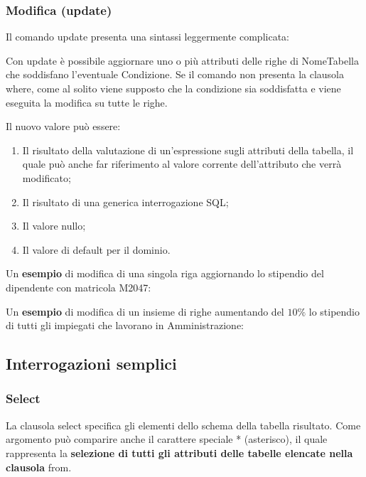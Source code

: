 \documentclass[a4paper]{article}
\begin{document}
	\subsubsection{Modifica (\textsf{update})}
	
	Il comando \textsf{update} presenta una sintassi leggermente complicata:
	
	Con \textsf{update} è possibile aggiornare uno o più attributi delle righe di \textsf{NomeTabella} che soddisfano l'eventuale \textsf{Condizione}. Se il comando non presenta la clausola \textsf{where}, come al solito viene supposto che la condizione sia soddisfatta e viene eseguita la modifica su tutte le righe.\newline
	
	\noindent
	Il nuovo valore può essere:
	\begin{enumerate}
		\item Il risultato della valutazione di un'espressione sugli attributi della tabella, il quale può anche far riferimento al valore corrente dell'attributo che verrà modificato;
		
		\item Il risultato di una generica interrogazione SQL;
		
		\item Il valore nullo;
		
		\item Il valore di default per il dominio.
	\end{enumerate}
	Un \textcolor{Green4}{\textbf{esempio}} di modifica di una singola riga aggiornando lo stipendio del dipendente con matricola \textsf{M2047}:
		
	Un \textcolor{Green4}{\textbf{esempio}} di modifica di un insieme di righe aumentando del $10\%$ lo stipendio di tutti gli impiegati che lavorano in Amministrazione:
	\newpage
	
	\subsection{Interrogazioni semplici}
	
	\subsubsection{\textsf{Select}}\label{select}
	
	La clausola \textsf{select} specifica gli elementi dello schema della tabella risultato. Come argomento può comparire anche il carattere speciale * (asterisco), il quale rappresenta la \textbf{selezione di tutti gli attributi delle tabelle elencate nella clausola} \textsf{from}.\newline
\end{document}
